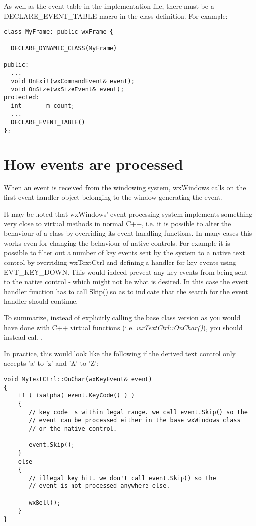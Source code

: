 As well as the event table in the implementation file, there must be a DECLARE\_EVENT\_TABLE
macro in the class definition. For example:

{\small%
\begin{verbatim}
class MyFrame: public wxFrame {

  DECLARE_DYNAMIC_CLASS(MyFrame)

public:
  ...
  void OnExit(wxCommandEvent& event);
  void OnSize(wxSizeEvent& event);
protected:
  int       m_count;
  ...
  DECLARE_EVENT_TABLE()
};
\end{verbatim}
}%

\section{How events are processed}\label{eventprocessing}

When an event is received from the windowing system, wxWindows calls  on
the first event handler object belonging to the window generating the event.

It may be noted that wxWindows' event processing system implements something
very close to virtual methods in normal C++, i.e. it is possible to alter
the behaviour of a class by overriding its event handling functions. In
many cases this works even for changing the behaviour of native controls.
For example it is possible to filter out a number of key events sent by the
system to a native text control by overriding wxTextCtrl and defining a
handler for key events using EVT\_KEY\_DOWN. This would indeed prevent
any key events from being sent to the native control - which might not be
what is desired. In this case the event handler function has to call Skip()
so as to indicate that the search for the event handler should continue.

To summarize, instead of explicitly calling the base class version as you
would have done with C++ virtual functions (i.e. {\it wxTextCtrl::OnChar()}),
you should instead call .

In practice, this would look like the following if the derived text control only
accepts 'a' to 'z' and 'A' to 'Z':

{\small%
\begin{verbatim}
void MyTextCtrl::OnChar(wxKeyEvent& event)
{
    if ( isalpha( event.KeyCode() ) )
    {
       // key code is within legal range. we call event.Skip() so the
       // event can be processed either in the base wxWindows class
       // or the native control.

       event.Skip();
    }
    else
    {
       // illegal key hit. we don't call event.Skip() so the
       // event is not processed anywhere else.

       wxBell();
    }
}
\end{verbatim}
}%



